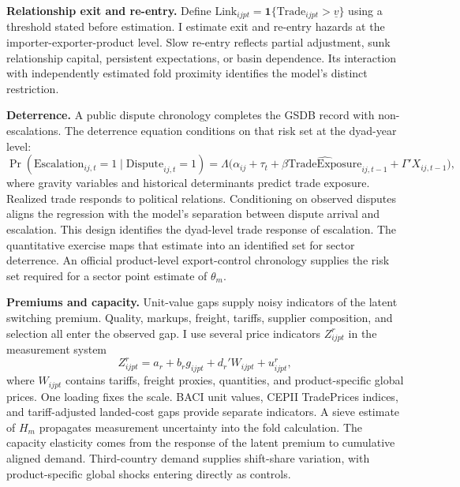 \documentclass[11pt]{article}
\theoremstyle{definition}
\newcommand{\one}{\mathbf{1}}
\begin{document}
\medskip
\noindent\textbf{Relationship exit and re-entry.} Define $\mathrm{Link}_{ijpt}=\one\{\mathrm{Trade}_{ijpt}>\underline v\}$ using a threshold stated before estimation. I estimate exit and re-entry hazards at the importer-exporter-product level. Slow re-entry reflects partial adjustment, sunk relationship capital, persistent expectations, or basin dependence. Its interaction with independently estimated fold proximity identifies the model's distinct restriction.

\medskip
\noindent\textbf{Deterrence.} A public dispute chronology completes the GSDB record with non-escalations. The deterrence equation conditions on that risk set at the dyad-year level:
\begin{equation}
\Pr(\mathrm{Escalation}_{ij,t}=1\mid\mathrm{Dispute}_{ij,t}=1)
=\Lambda\big(\alpha_{ij}+\tau_t+\beta\widehat{\mathrm{TradeExposure}}_{ij,t-1}+\Gamma'X_{ij,t-1}\big),
\label{eq:deterrence-test}
\end{equation}
where gravity variables and historical determinants predict trade exposure. Realized trade responds to political relations. Conditioning on observed disputes aligns the regression with the model's separation between dispute arrival and escalation. This design identifies the dyad-level trade response of escalation. The quantitative exercise maps that estimate into an identified set for sector deterrence. An official product-level export-control chronology supplies the risk set required for a sector point estimate of $\theta_m$.

\medskip
\noindent\textbf{Premiums and capacity.} Unit-value gaps supply noisy indicators of the latent switching premium. Quality, markups, freight, tariffs, supplier composition, and selection all enter the observed gap. I use several price indicators $Z^r_{ijpt}$ in the measurement system
\begin{equation}
Z^r_{ijpt}=a_r+b_r g_{ijpt}+d_r'W_{ijpt}+u^r_{ijpt},
\label{eq:premium-measurement}
\end{equation}
where $W_{ijpt}$ contains tariffs, freight proxies, quantities, and product-specific global prices. One loading fixes the scale. BACI unit values, CEPII TradePrices indices, and tariff-adjusted landed-cost gaps provide separate indicators. A sieve estimate of $H_m$ propagates measurement uncertainty into the fold calculation. The capacity elasticity comes from the response of the latent premium to cumulative aligned demand. Third-country demand supplies shift-share variation, with product-specific global shocks entering directly as controls.
\end{document}
